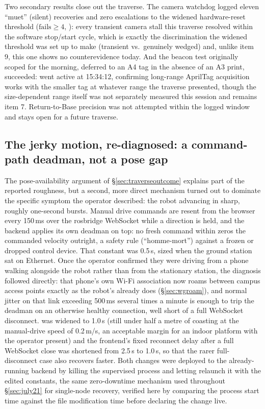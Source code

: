 Two secondary results close out the traverse. The camera watchdog logged
eleven ``muet'' (silent) recoveries and zero escalations to the widened
hardware-reset threshold ($\text{fails} \ge 4$,
): every transient camera stall this traverse
resolved within the software stop/start cycle, which is exactly the
discrimination the widened threshold was set up to make (transient vs.\
genuinely wedged) and, unlike item 9, this one shows no counterevidence
today. And the beacon test originally scoped for the morning, deferred
to an A4 tag in the absence of an A3 print, succeeded: 
went active at 15:34:12, confirming long-range AprilTag acquisition works
with the smaller tag at whatever range the traverse presented, though the
size-dependent range itself was not separately measured this session and
remains item 7. Return-to-Base precision was not attempted within the
logged window and stays open for a future traverse.

\subsection{The jerky motion, re-diagnosed: a command-path deadman, not a pose gap}
\label{sec:manualdeadman}
The pose-availability argument of \S\ref{sec:traverseoutcome} explains part
of the reported roughness, but a second, more direct mechanism turned out to
dominate the specific symptom the operator described: the robot advancing in
sharp, roughly one-second bursts. Manual drive commands are resent from the
browser every 150\,ms over the rosbridge WebSocket while a direction is
held, and the backend applies its own deadman on top: no fresh command
within \code{MANUAL\_DEADMAN} zeros the commanded velocity outright, a
safety rule (``homme-mort'') against a frozen or dropped control device.
That constant was 0.5\,s, sized when the ground station sat on Ethernet.
Once the operator confirmed they were driving from a phone walking alongside
the robot rather than from the stationary station, the diagnosis followed
directly: that phone's own Wi-Fi association now roams between campus
access points exactly as the robot's \code{wlan\_int} already does
(\S\ref{sec:wgroam}), and normal jitter on that link exceeding 500\,ms
several times a minute is enough to trip the deadman on an otherwise healthy
connection, well short of a full WebSocket disconnect. \code{MANUAL\_DEADMAN}
was widened to 1.0\,s (still under half a metre of coasting at the
manual-drive speed of 0.2\,m/s, an acceptable margin for an indoor platform
with the operator present) and the frontend's fixed reconnect delay after a
full WebSocket close was shortened from 2.5\,s to 1.0\,s, so that the rarer
full-disconnect case also recovers faster. Both changes were deployed to the
already-running backend by killing the supervised process and letting
\code{respawn="true"} relaunch it with the edited constants, the same
zero-downtime mechanism used throughout \S\ref{sec:july21} for single-node
recovery, verified here by comparing the process start time against the file
modification time before declaring the change live.

